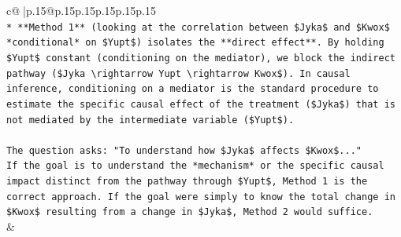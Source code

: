 \documentclass{article}
\begin{document}
{\begin{supertabular}{c@{$\;$}|p{.15\linewidth}@{}p{.15\linewidth}p{.15\linewidth}p{.15\linewidth}p{.15\linewidth}p{.15\linewidth}}
{{{\\ 
\texttt{*   **Method 1** (looking at the correlation between \$Jyka\$ and \$Kwox\$ *conditional* on \$Yupt\$) isolates the **direct effect**. By holding \$Yupt\$ constant (conditioning on the mediator), we block the indirect pathway (\$Jyka \textbackslash{}rightarrow Yupt \textbackslash{}rightarrow Kwox\$). In causal inference, conditioning on a mediator is the standard procedure to estimate the specific causal effect of the treatment (\$Jyka\$) that is not mediated by the intermediate variable (\$Yupt\$).} \\
\\ 
\texttt{The question asks: "To understand how \$Jyka\$ affects \$Kwox\$..."} \\
\texttt{If the goal is to understand the *mechanism* or the specific causal impact distinct from the pathway through \$Yupt\$, Method 1 is the correct approach. If the goal were simply to know the total change in \$Kwox\$ resulting from a change in \$Jyka\$, Method 2 would suffice.} \\
            }
        }
    }
    & \\ \\


\end{supertabular}}
\end{document}
